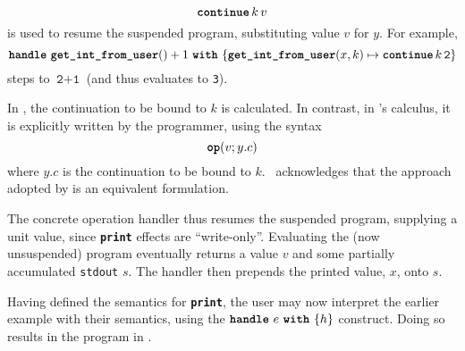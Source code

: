 \[\textbf{\texttt{continue}} \, {k} \, {v}\] 
is used to resume the suspended program, substituting value $v$ for $y$. For example,  
\[\textbf{\texttt{handle}} \,\, {\textbf{\texttt{get\_int\_from\_user}}() + 1} \,\, \textbf{\texttt{with}} \,\, \{{\textbf{\texttt{get\_int\_from\_user}}(x, k) \mapsto \textbf{\texttt{continue}} \, {k} \, {\texttt{2}}}\}\]
steps to $\texttt{2} + \texttt{1}$ (and thus evaluates to \texttt{3}).

In \efflang{}, the continuation to be bound to $k$ is calculated. In contrast, in \citeauthor{pretnar-15}'s calculus, it is explicitly written by the programmer, using the syntax 
\[\textbf{\texttt{op}}({v; y.c})\]
where $y.c$ is the continuation to be bound to $k$.\ \citeauthor{pretnar-15} acknowledges that the approach adopted by \efflang{} is an equivalent formulation.

The concrete operation handler thus resumes the suspended program, supplying a unit value, since \textbf{\texttt{print}} effects are ``write-only''. Evaluating the (now unsuspended) program eventually returns a value $v$ and some partially accumulated \texttt{stdout} $s$. The handler then prepends the printed value, $x$, onto $s$. 



% 
Having defined the semantics for \textbf{\texttt{print}}, the user may now interpret the earlier example with their semantics, using the $\textbf{\texttt{handle}} \,\, {e} \,\, \textbf{\texttt{with}} \,\, \{{h}\}$ construct. Doing so results in the program in .

